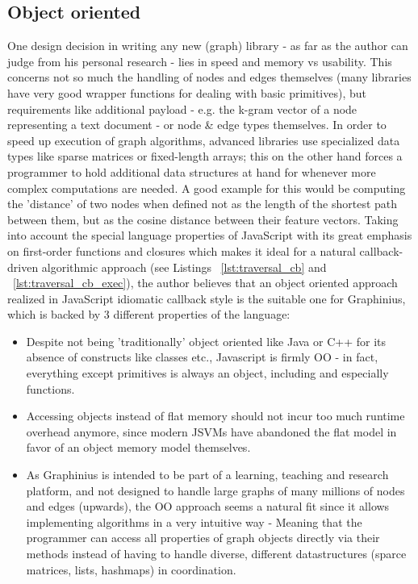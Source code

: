	
	\subsection{Object oriented}
	\label{ssect:oo}
	One design decision in writing any new (graph) library - as far as the author can judge from his personal research - lies in speed and memory vs usability. This concerns not so much the handling of nodes and edges themselves (many libraries have very good wrapper functions for dealing with basic primitives), but requirements like additional payload - e.g. the k-gram vector of a node representing a text document - or node \& edge types themselves. In order to speed up execution of graph algorithms, advanced libraries use specialized data types like sparse matrices or fixed-length arrays; this on the other hand forces a programmer to hold additional data structures at hand for whenever more complex computations are needed. A good example for this would be computing the 'distance' of two nodes when defined not as the length of the shortest path between them, but as the cosine distance between their feature vectors. Taking into account the special language properties of JavaScript with its great emphasis on first-order functions and closures which makes it ideal for a natural callback-driven algorithmic approach (see Listings ~\ref{lst:traversal_cb} and ~\ref{lst:traversal_cb_exec}), the author believes that an object oriented approach realized in JavaScript idiomatic callback style is the suitable one for Graphinius, which is backed by 3 different properties of the language:
	
	\begin{itemize}
		\item Despite not being 'traditionally' object oriented like Java or C++ for its absence of constructs like classes etc., Javascript is firmly OO - in fact, everything except primitives is always an object, including and especially functions.
		
		\item Accessing objects instead of flat memory should not incur too much runtime overhead anymore, since modern JSVMs have abandoned the flat model in favor of an object memory model themselves.
		
		\item As Graphinius is intended to be part of a learning, teaching and research platform, and not designed to handle large graphs of many millions of nodes and edges (upwards), the OO approach seems a natural fit since it allows implementing algorithms in a very intuitive way - Meaning that the programmer can access all properties of graph objects directly via their methods instead of having to handle diverse, different datastructures (sparce matrices, lists, hashmaps) in coordination.
	\end{itemize}
